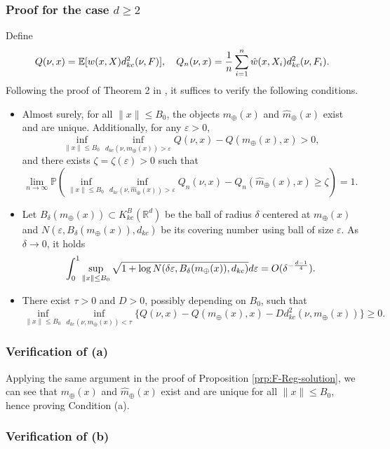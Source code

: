 \documentclass[11pt,reqno]{amsart}
\begin{document}
\subsubsection{Proof for the case $d \geq 2$}
Define 
\[
Q(\nu,x)=\mathbb{E}[w(x,X)d_{kc}^2(\nu,F)],\quad  Q_n(\nu,x)={1 \over n}\sum_{i=1}^n\hat{w}(x,X_i)d_{kc}^2(\nu,F_i).
\]
Following the proof of Theorem 2 in \cite{PeMu19}, it suffices to verify the following conditions. 
\begin{itemize}
\item[(a)] Almost surely, for all $\|x\| \leq B_0$, the objects $m_\oplus(x)$ and $\hat{m}_\oplus(x)$ exist and are unique. Additionally, for any $\varepsilon>0$, 
\[
\inf_{\|x\|\leq B_0}\inf_{d_{kc}(\nu,m_\oplus(x))>\varepsilon}Q(\nu,x) - Q(m_\oplus(x),x)>0,
\]
and there exists $\zeta = \zeta(\varepsilon)>0$ such that
\[
\lim_{n \to \infty}\mathbb{P}\left(\inf_{\|x\|\leq B_0}\inf_{d_{kc}(\nu,\hat{m}_\oplus(x))>\varepsilon}Q_n(\nu,x) - Q_n(\hat{m}_\oplus(x),x) \geq \zeta\right) = 1.
\]
\item[(b)] Let $B_\delta(m_\oplus(x)) \subset K_{kc}^B(\mathbb{R}^d)$ be the ball of radius $\delta$ centered at $m_\oplus(x)$ and $N(\varepsilon, B_\delta(m_\oplus(x)),d_{kc})$ be its covering number using ball of size $\varepsilon$. As $\delta \to 0$, it holds
\[
\int_0^1 \sup_{\|x\|\leq B_0}\sqrt{1 + \log N(\delta\varepsilon, B_\delta(m_\oplus(x)),d_{kc})}d\varepsilon = O(\delta^{-{d-1 \over 4}}). 
\]
\item[(c)] There exist $\tau>0$ and $D>0$, possibly depending on $B_0$, such that
\[
\inf_{\|x\|\leq B_0}\inf_{d_{kc}(\nu,m_\oplus(x))<\tau}\{Q(\nu,x) - Q(m_\oplus(x),x) - Dd_{kc}^2(\nu,m_\oplus(x))\} \geq 0. 
\]
\end{itemize}

\subsubsection*{Verification of (a)}

Applying the same argument in the proof of Proposition \ref{prp:F-Reg-solution}, we can see that $m_\oplus(x)$ and $\hat{m}_\oplus(x)$ exist and are unique for all $\|x\| \leq B_0$, hence proving Condition (a). 

\subsubsection*{Verification of (b)}
\end{document}
